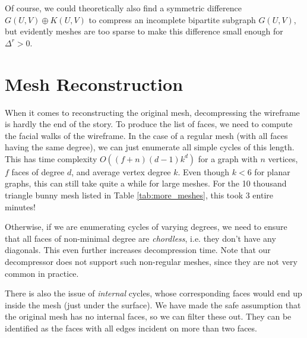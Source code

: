 \documentclass{egpubl}
\begin{document}
Of course, we could theoretically also find a symmetric difference $G(U,V) \oplus K(U,V)$ to compress an incomplete bipartite subgraph $G(U,V)$, but evidently meshes are too sparse to make this difference small enough for $\Delta^r > 0$. %


\section{Mesh Reconstruction} \label{sec:reconstruction}

When it comes to reconstructing the original mesh,
decompressing the wireframe is hardly the end of the story.
To produce the list of faces, we need to compute the facial walks of the wireframe.
In the case of a regular mesh (with all faces having the same degree), we can just enumerate all simple cycles of this length. This has time complexity $O((f + n)(d - 1)k^d)$ for a graph with $n$ vertices, $f$ faces of degree $d$, and average vertex degree $k$. Even though $k < 6$ for planar graphs, this can still take quite a while for large meshes.
For the 10 thousand triangle bunny mesh listed in Table \ref{tab:more_meshes}, this took 3 entire minutes!

Otherwise, if we are enumerating cycles of varying degrees, we need to ensure that all faces of non-minimal degree are \textit{chordless}, i.e. they don't have any diagonals. This even further increases decompression time. %
Note that our decompressor does not support such non-regular meshes, since they are not very common in practice.

There is also the issue of \textit{internal} cycles, whose corresponding faces would end up inside the mesh (just under the surface). %
We have made the safe assumption that the original mesh has no internal faces, so we can filter these out. They can be identified as the faces with all edges incident on more than two faces.
\end{document}
